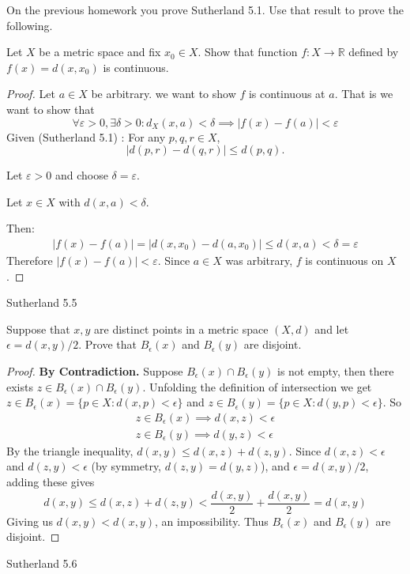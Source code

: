 \documentclass[minion]{homework}
\newcommand{\Reals}{\ensuremath{\mathbb R}}%
\begin{document}
\begin{problems}

\problem On the previous homework you prove Sutherland 5.1.  Use that result to prove the following.

Let $X$ be a metric space and fix $x_0\in X$.  Show that function $f:X\to\Reals$
defined by $f(x) = d(x,x_0)$ is continuous. \newline
\begin{proof}
  Let $a \in X$ be arbitrary. we want to show $f$ is continuous at $a$. That is we want to show that 
  $$ \forall\varepsilon > 0, \exists\delta > 0 : d_X(x,a) < \delta \implies |f(x) - f(a)| < \varepsilon$$
  Given (Sutherland 5.1) : For any $p, q, r \in X$, $$|d(p,r) - d(q,r)| \leq d(p,q).$$

  Let $\varepsilon > 0$ and choose $\delta = \varepsilon$.

  Let $x \in X$ with $d(x, a) < \delta$.
  
  Then: 
  \begin{align*}
    |f(x) - f(a)| = |d(x,x_0) - d(a,x_0)| \leq d(x,a) < \delta = \varepsilon
  \end{align*}
  Therefore $|f(x) - f(a)| < \varepsilon$. Since $a \in X$ was arbitrary, $f$ is continuous on $X$.
\end{proof}
\problem Sutherland 5.5

Suppose that $x, y$ are distinct points in a metric space $(X,d)$ and let
$\epsilon = d(x,y)/2$. Prove that $B_\epsilon(x)$ and $B_\epsilon(y)$ are disjoint. \newline

\begin{proof}
  \textbf{By Contradiction.} Suppose $B_\epsilon(x) \cap B_\epsilon(y)$ is not empty, then there exists $z \in B_\epsilon(x) \cap B_\epsilon(y)$. Unfolding the definition of intersection we get $z \in B_\epsilon(x) = \{p \in X : d(x,p) < \epsilon\}$ and $z \in B_\epsilon(y) = \{ p \in X : d(y, p) < \epsilon\}$. So
  \begin{align*}
    z \in B_\epsilon(x) \implies d(x, z) < \epsilon \\
    z \in B_\epsilon(y) \implies d(y, z) < \epsilon
  \end{align*}
  By the triangle inequality, $d(x,y) \leq d(x,z) + d(z,y)$. Since $d(x,z) < \epsilon$ and $d(z,y) < \epsilon$ (by symmetry, $d(z,y) = d(y,z)$), and $\epsilon = d(x,y)/2$, adding these gives
  $$d(x,y) \leq d(x,z) + d(z,y) < \frac{d(x,y)}{2} + \frac{d(x,y)}{2} = d(x,y)$$
  Giving us $d(x,y) < d(x,y)$, an impossibility. Thus $B_\epsilon(x)$ and $B_\epsilon(y)$ are disjoint.
\end{proof}
\problem Sutherland 5.6


\end{problems}
\end{document}
